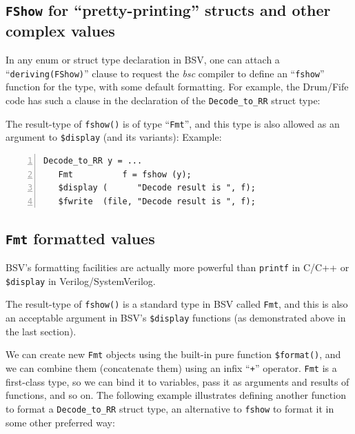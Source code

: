 
\subsection{{\tt FShow} for ``pretty-printing'' structs and other complex values}


In any enum or struct type declaration in BSV, one can attach a
``\verb|deriving(FShow)|'' clause to request the \emph{bsc} compiler
to define an ``\verb|fshow|'' function for the type, with some default
formatting.  For example, the Drum/Fife code has such a clause in the
declaration of the \verb|Decode_to_RR| struct type:



The result-type of \verb|fshow()| is of type ``\verb|Fmt|'', and this
type is also allowed as an argument to \verb|$display| (and its
variants):  Example:

{\small
\begin{Verbatim}[frame=single, numbers=left]
   Decode_to_RR y = ...
   Fmt          f = fshow (y);
   $display (      "Decode result is ", f);
   $fwrite  (file, "Decode result is ", f);
\end{Verbatim}
}


\subsection{{\tt Fmt} formatted values}


BSV's formatting facilities are actually more powerful than
\verb|printf| in C/C++ or \verb|$display| in Verilog/SystemVerilog.

The result-type of \verb|fshow()| is a standard type in BSV called
\verb|Fmt|, and this is also an acceptable argument in BSV's
\verb|$display| functions (as demonstrated above in the last section).

We can create new \verb|Fmt| objects using the built-in pure function
\verb|$format()|, and we can combine them (concatenate them) using an
infix ``\verb|+|'' operator.  \verb|Fmt| is a first-class type, so we
can bind it to variables, pass it as arguments and results of
functions, and so on.  The following example illustrates defining
another function to format a \verb|Decode_to_RR| struct type, an
alternative to \verb|fshow| to format it in some other preferred way:


